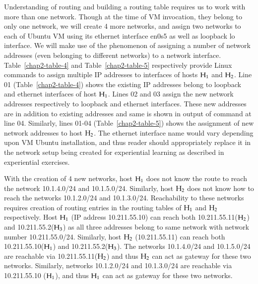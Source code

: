 \begin{multicols}{2}
Understanding of routing and building a routing table requires us to work with more than one network. Though at the time of VM invocation, they belong to only one network, we will create 4 more networks, and assign two networks to each of Ubuntu VM using its ethernet interface en0s5 as well as loopback lo interface. We will make use of the phenomenon of assigning a number of network addresses (even belonging to different networks) to a network interface.  Table~\ref{chap2-table-4} and Table~\ref{chap2-table-5} respectively provide Linux commands to assign multiple IP addresses to interfaces of hosts ${\rm H}_{1}$ and ${\rm H}_{2}$. Line 01 (Table~\ref{chap2-table-4}) shows the existing IP addresses belong to loopback and ethernet interfaces of host ${\rm H}_{1}$.  Lines 02 and 03 assign the new network addresses respectively to loopback and ethernet interfaces. These new addresses are in addition to existing addresses and same is shown in output of command at line 04. Similarly, lines 01-04 (Table~\ref{chap2-table-5}) shows the assignment of new network addresses to host ${\rm H}_{2}$. The ethernet interface name would vary depending upon VM Ubuntu installation, and thus reader should appropriately replace it in the network setup being created for experiential learning as described in experiential exercises.

With the creation of 4 new networks, host ${\rm H}_{1}$ does not know the route to reach the network 10.1.4.0/24 and 10.1.5.0/24. Similarly, host ${\rm H}_{2}$ does not know how to reach the networks 10.1.2.0/24 and 10.1.3.0/24. Reachability to these networks requires creation of routing entries in the routing tables of ${\rm H}_{1}$ and ${\rm H}_{2}$ respectively. Host ${\rm H}_{1}$ (IP address 10.211.55.10) can reach both 10.211.55.11(${\rm H}_{2}$) and 10.211.55.2(${\rm H}_{3}$) as all three addresses belong to same network with network number 10.211.55.0/24. Similarly, host ${\rm H}_{2}$ (10.211.55.11) can reach both 10.211.55.10(${\rm H}_{1}$) and 10.211.55.2(${\rm H}_{3}$). The networks 10.1.4.0/24 and 10.1.5.0/24 are reachable via 10.211.55.11(${\rm H}_{2}$) and thus ${\rm H}_{2}$ can act as gateway for these two networks. Similarly, networks 10.1.2.0/24 and 10.1.3.0/24 are reachable via 10.211.55.10 (${\rm H}_{1}$), and thus ${\rm H}_{1}$ can act as gateway for these two networks. 
\end{multicols}

